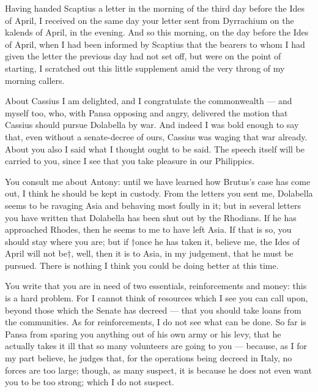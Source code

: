

 Having handed Scaptius a letter in the morning of the third day before the Ides of April, I received on the same day your letter sent from Dyrrachium on the kalends of April, in the evening. And so this morning, on the day before the Ides of April, when I had been informed by Scaptius that the bearers to whom I had given the letter the previous day had not set off, but were on the point of starting, I scratched out this little supplement amid the very throng of my morning callers.

 About Cassius I am delighted, and I congratulate the commonwealth --- and myself too, who, with Pansa opposing and angry, delivered the motion that Cassius should pursue Dolabella by war. And indeed I was bold enough to say that, even without a senate-decree of ours, Cassius was waging that war already. About you also I said what I thought ought to be said. The speech itself will be carried to you, since I see that you take pleasure in our Philippics.

 You consult me about Antony: until we have learned how Brutus's case has come out, I think he should be kept in custody. From the letters you sent me, Dolabella seems to be ravaging Asia and behaving most foully in it; but in several letters you have written that Dolabella has been shut out by the Rhodians. If he has approached Rhodes, then he seems to me to have left Asia. If that is so, you should stay where you are; but if †once he has taken it, believe me, the Ides of April will not be†, well, then it is to Asia, in my judgement, that he must be pursued. There is nothing I think you could be doing better at this time.

 You write that you are in need of two essentials, reinforcements and money: this is a hard problem. For I cannot think of resources which I see you can call upon, beyond those which the Senate has decreed --- that you should take loans from the communities. As for reinforcements, I do not see what can be done. So far is Pansa from sparing you anything out of his own army or his levy, that he actually takes it ill that so many volunteers are going to you --- because, as I for my part believe, he judges that, for the operations being decreed in Italy, no forces are too large; though, as many suspect, it is because he does not even want you to be too strong; which I do not suspect.

